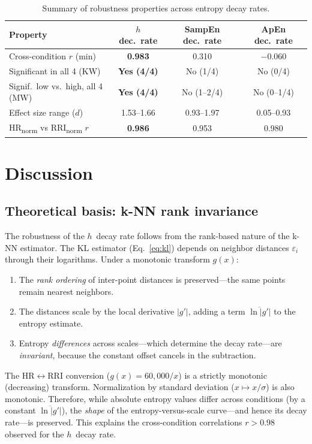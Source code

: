 \documentclass[12pt,a4paper]{article}
\begin{document}
\begin{table}[htbp]
\centering
\caption{Summary of robustness properties across entropy decay rates.}\label{tab:summary}
\begin{tabular}{@{}l ccc@{}}
\toprule
Property & $h$ dec.\ rate & SampEn dec.\ rate & ApEn dec.\ rate \\
\midrule
Cross-condition $r$ (min) & \textbf{0.983} & 0.310 & $-0.060$ \\
Significant in all 4 (KW) & \textbf{Yes (4/4)} & No (1/4) & No (0/4) \\
Signif.\ low vs.\ high, all 4 (MW) & \textbf{Yes (4/4)} & No (1--2/4) & No (0--1/4) \\
Effect size range ($d$) & 1.53--1.66 & 0.93--1.97 & 0.05--0.93 \\
HR\textsubscript{norm} vs RRI\textsubscript{norm} $r$ & \textbf{0.986} & 0.953 & 0.980 \\
\bottomrule
\end{tabular}
\end{table}


\section{Discussion}\label{sec:discussion}

\subsection{Theoretical basis: k-NN rank invariance}\label{sec:theory}

The robustness of the $h$~decay rate follows from the rank-based nature of the k-NN estimator.
The KL estimator (Eq.~\ref{eq:kl}) depends on neighbor distances $\varepsilon_i$ through their logarithms.
Under a monotonic transform $g(x)$:
\begin{enumerate}
  \item The \emph{rank ordering} of inter-point distances is preserved---the same points remain nearest neighbors.
  \item The distances scale by the local derivative $|g'|$, adding a term $\overline{\ln|g'|}$ to the entropy estimate.
  \item Entropy \emph{differences} across scales---which determine the decay rate---are \emph{invariant}, because the constant offset cancels in the subtraction.
\end{enumerate}

The HR$\leftrightarrow$RRI conversion ($g(x) = 60{,}000/x$) is a strictly monotonic (decreasing) transform.
Normalization by standard deviation ($x \mapsto x/\sigma$) is also monotonic.
Therefore, while absolute entropy values differ across conditions (by a constant $\overline{\ln|g'|}$), the \emph{shape} of the entropy-versus-scale curve---and hence its decay rate---is preserved.
This explains the cross-condition correlations $r > 0.98$ observed for the $h$~decay rate.
\end{document}
